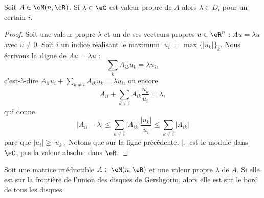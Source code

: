 \begin{theorem}[Gershgorin]     \label{THOooUJNFooHpvCCF}
	Soit \( A\in \eM(n,\eR)\). Si \( \lambda\in \eC\) est valeur propre de \( A\) alors \(   \lambda\in D_i   \) pour un certain \( i\).
\end{theorem}

\begin{proof}
	Soit une valeur propre \( \lambda\) et un de ses vecteurs propres \( u\in \eR^n\) : \( Au=\lambda u\) avec \( u\neq 0\). Soit \( i\) un indice réalisant le maximum \( | u_i |=\max\{ | u_k | \}_k\). Nous écrivons la \( i\)\ieme ligne de \( Au=\lambda u\) :
	\begin{equation}
		\sum_kA_{ik}u_k=\lambda u_i,
	\end{equation}
	c'est-à-dire \( A_{ii}u_i+\sum_{k\neq i}A_{ik}u_k=\lambda u_i\), ou encore
	\begin{equation}
		A_{ii}+\sum_{k\neq i}A_{ik}\frac{ u_k }{ u_i }=\lambda,
	\end{equation}
	qui donne
	\begin{equation}
		| A_{ii} -\lambda|\leq \sum_{k\neq i}| A_{ik} |\frac{ | u_k | }{ | u_i | }\leq \sum_{k\neq i}| A_{ik} |
	\end{equation}
	pare que \( | u_i |\geq | u_k |\). Notons que sur la ligne précédente, \( | . |\) est le module dans \( \eC\), pas la valeur absolue dans \( \eR\).
\end{proof}

\begin{theorem}      \label{THOooTXAPooQqsBCj}
	Soit une matrice irréductible \( A\in \eM(n,\eR)\) et une valeur propre \( \lambda\) de \( A\). Si elle est sur la frontière de l'union des disques de Gershgorin, alors elle est sur le bord de tous les disques.
\end{theorem}

